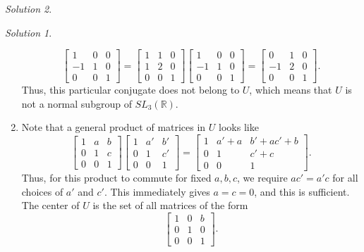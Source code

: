 \documentclass[11pt]{report}
\def\R{\mathbb{R}}
\theoremstyle{remark}
\newtheorem*{solution}{Solution}
\begin{document}
\begin{solution}
\begin{solution}
\begin{enumerate}
\[\begin{bmatrix}
                1 & 0 & 0 \\ -1 & 1 & 0 \\ 0 & 0 & 1
            \end{bmatrix} = \begin{bmatrix}
                1 & 1 & 0 \\ 1 & 2 & 0 \\ 0 & 0 & 1
            \end{bmatrix} \begin{bmatrix}
                1 & 0 & 0 \\ -1 & 1 & 0 \\ 0 & 0 & 1
            \end{bmatrix} = \begin{bmatrix}
                0 & 1 & 0 \\ -1 & 2 & 0 \\ 0 & 0 & 1
            \end{bmatrix}.
        \] Thus, this particular conjugate does not belong to $U$, which means that
        $U$ is not a normal subgroup of $SL_3(\R)$.

        \item Note that a general product of matrices in $U$ looks like \[
            \begin{bmatrix}
                1 & a & b \\ 0 & 1 & c \\ 0 & 0 & 1
            \end{bmatrix} \begin{bmatrix}
                1 & a' & b' \\ 0 & 1 & c' \\ 0 & 0 & 1
            \end{bmatrix} = \begin{bmatrix}
                1 & a' + a & b' + ac' + b \\ 0 & 1 & c' + c \\ 0 & 0 & 1
            \end{bmatrix}.
        \] Thus, for this product to commute for fixed $a, b, c$, we require $ac' =
        a'c$ for all choices of $a'$ and $c'$. This immediately gives $a = c = 0$,
        and this is sufficient. The center of $U$ is the set of all matrices of the
        form \[
            \begin{bmatrix}
                1 & 0 & b \\ 0 & 1 & 0 \\ 0 & 0 & 1
            \end{bmatrix}.
        \] 
    \end{enumerate}
    \end{solution}
    

\end{solution}
\end{document}
